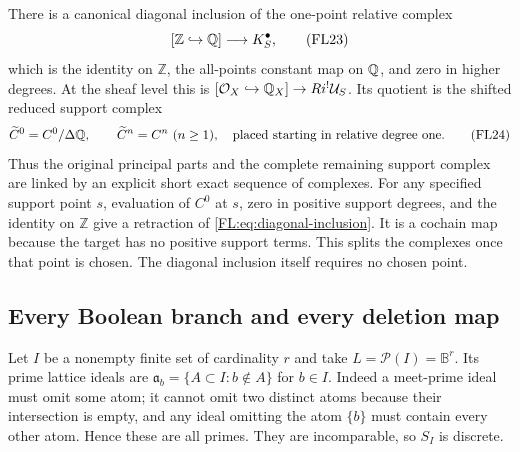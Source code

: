There is a canonical diagonal inclusion of the one-point relative
complex
\[
 [\mathbb Z\hookrightarrow\mathbb Q]\longrightarrow K_S^\bullet,
 \tag{FL23}\label{FL:eq:diagonal-inclusion}
\]
which is the identity on $\mathbb Z$, the all-points constant map
on $\mathbb Q$, and zero in higher degrees. At the sheaf level this is
$[\mathcal O_X\hookrightarrow\mathbb Q_X]\to Ri^!\mathcal U_S$.
Its quotient is the shifted reduced support complex
\[
 \widetilde C^0=C^0/\Delta\mathbb Q,\qquad
 \widetilde C^n=C^n\ (n\ge1),
 \quad\text{placed starting in relative degree one}.
 \tag{FL24}\label{FL:eq:reduced-support-complex}
\]
Thus the original principal parts and the complete remaining support
complex are linked by an explicit short exact sequence of complexes.
For any specified support point $s$, evaluation of $C^0$ at $s$,
zero in positive support degrees, and the identity on $\mathbb Z$
give a retraction of \eqref{FL:eq:diagonal-inclusion}. It is a cochain
map because the target has no positive support terms. This splits
the complexes once that point is chosen. The diagonal inclusion
itself requires no chosen point.

\subsection{Every Boolean branch and every deletion map}

Let $I$ be a nonempty finite set of cardinality $r$ and take
$L=\mathcal P(I)=\mathbb B^r$. Its prime lattice ideals are
$\mathfrak a_b=\{A\subset I:b\notin A\}$ for $b\in I$.
Indeed a meet-prime ideal must omit some atom; it cannot omit two
distinct atoms because their intersection is empty, and any ideal
omitting the atom $\{b\}$ must contain every other atom. Hence these
are all primes. They are incomparable, so $S_I$ is discrete.

